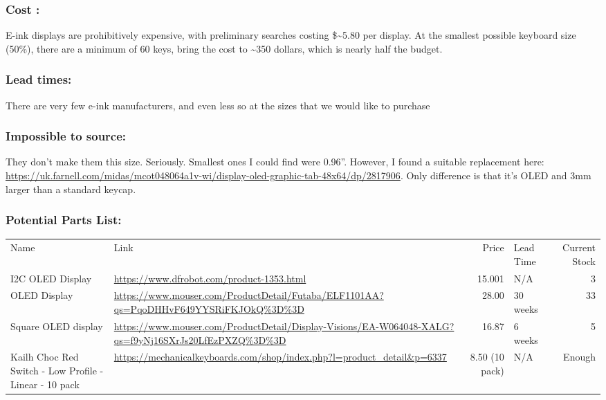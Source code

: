 \documentclass[11pt]{article}
\begin{document}
\subsubsection{Cost :}
\label{sec:org1d01cc1}
E-ink displays are prohibitively expensive, with preliminary searches costing \$\textasciitilde{}5.80 per display. At the smallest possible keyboard size (50\%), there are a minimum of 60 keys, bring the cost to \textasciitilde{}350 dollars, which is nearly half the budget.
\subsubsection{Lead times:}
\label{sec:orga33261d}
There are very few e-ink manufacturers, and even less so at the sizes that we would like to purchase
\subsubsection{Impossible to source:}
\label{sec:org539ae37}
They don’t make them this size. Seriously.  Smallest ones I could find were 0.96”.  However, I found a suitable replacement here: \url{https://uk.farnell.com/midas/mcot048064a1v-wi/display-oled-graphic-tab-48x64/dp/2817906}.  Only difference is that it’s OLED and 3mm larger than a standard keycap.

\subsubsection{Potential Parts List:}
\label{sec:org82ac613}
\begin{center}
\begin{tabular}{llrlr}
Name & Link & Price & Lead Time & Current Stock\\
I2C OLED Display & \url{https://www.dfrobot.com/product-1353.html} & 15.001 & N/A & 3\\
OLED Display & \url{https://www.mouser.com/ProductDetail/Futaba/ELF1101AA?qs=PqoDHHvF649YYSRiFKJOkQ\%3D\%3D} & 28.00 & 30 weeks & 33\\
Square OLED display & \url{https://www.mouser.com/ProductDetail/Display-Visions/EA-W064048-XALG?qs=f9yNj16SXrJs20LfEzPXZQ\%3D\%3D} & 16.87 & 6 weeks & 5\\
Kailh Choc Red Switch - Low Profile - Linear - 10 pack & \url{https://mechanicalkeyboards.com/shop/index.php?l=product\_detail\&p=6337} & 8.50 (10 pack) & N/A & Enough\\
\end{tabular}
\end{center}
\end{document}
